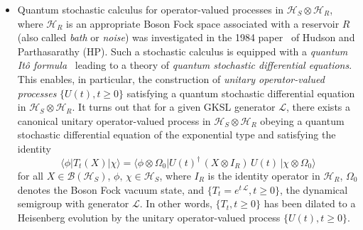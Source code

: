 \begin{itemize}
\item Quantum stochastic calculus for operator-valued processes in $\mathcal{H}_S\otimes\mathcal{H}_R$, where $\mathcal{H}_R$ is an appropriate Boson Fock space associated with a reservoir $R$ (also called {\it bath} or {\it noise}) was investigated in the 1984 paper~\cite{chap8-key7} of Hudson and Parthasarathy (HP). Such a stochastic calculus is equipped with a {\it quantum It{\^o} formula}~\cite{chap8-key7,chap8-key8} leading to a theory of {\it quantum stochastic differential equations}. This enables, in particular, the construction of {\it unitary operator-valued processes} $\{U(t), t\geq 0\}$ satisfying a quantum stochastic differential equation in $\mathcal{H}_S\otimes\mathcal{H}_R$. It turns out that for a given GKSL generator $\mathcal{L}$, there exists a canonical unitary operator-valued process in $\mathcal{H}_S\otimes\mathcal{H}_R$ obeying a quantum stochastic differential equation of the exponential type and satisfying the identity 
$$
\langle \phi\vert T_t(X)\vert \chi \rangle=\langle \phi\otimes \Omega_0\vert U(t)^\dag\, (X\otimes I_R)\, U(t)\,\vert \chi\otimes \Omega_0 \rangle
$$ 
for all $X\in \mathcal{B}(\mathcal{H}_S)$, $\phi,\, \chi\in \mathcal{H}_S$, where  $I_R$ is the identity operator in $\mathcal{H}_R$, $\Omega_0$ denotes the  Boson Fock vacuum state,  and $\{T_t=e^{t\,\mathcal{L}}, t\geq 0\}$, the dynamical semigroup with generator $\mathcal{L}$. In other words,  $\{T_t,t\geq 0\}$ has been dilated to a Heisenberg evolution by the unitary operator-valued process $\{U(t), t\geq 0\}$. 


\end{itemize}
